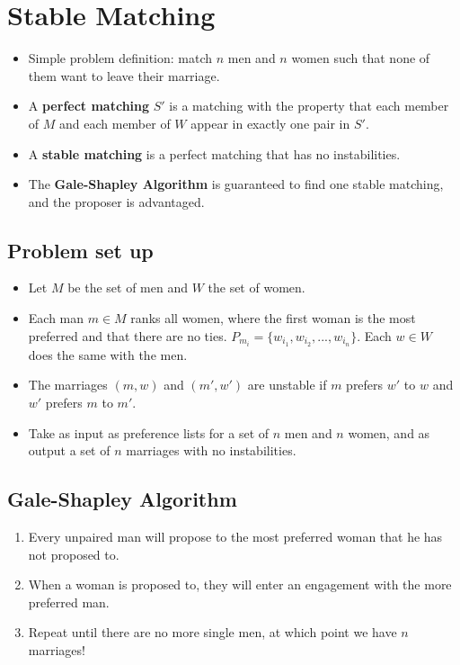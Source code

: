 \documentclass[11pt]{article}
\begin{document}
\tableofcontents
\newpage

\section{Stable Matching}
\begin{tcolorbox}
\begin{itemize}
    \item Simple problem definition: match $n$ men and $n$ women such that none of them want to leave their marriage.
    \item A \textbf{perfect matching} $S'$ is a matching with the property that each member of $M$ and each member of $W$ appear in exactly one pair in $S'$.
    \item A \textbf{stable matching} is a perfect matching that has no instabilities.
    \item The \textbf{Gale-Shapley Algorithm} is guaranteed to find one stable matching, and the proposer is advantaged.
\end{itemize}
\end{tcolorbox}

\subsection{Problem set up}
\begin{itemize}
    \item Let $M$ be the set of men and $W$ the set of women.
    \item Each man $m \in M$ ranks all women, where the first woman is the most preferred and that there are no ties. $P_{m_i} = \lbrace w_{i_1}, w_{i_2}, ..., w_{i_n} \rbrace$. Each $w \in W$ does the same with the men.
    \item The marriages $(m,w)$ and $(m', w')$ are unstable if $m$ prefers $w'$ to $w$ and $w'$ prefers $m$ to $m'$.
    \item Take as input as preference lists for a set of $n$ men and $n$ women, and as output a set of $n$ marriages with no instabilities.
    
\end{itemize}
\subsection{Gale-Shapley Algorithm}
\begin{enumerate}
    \item Every unpaired man will propose to the most preferred woman that he has not proposed to.
    \item When a woman is proposed to, they will enter an engagement with the more preferred man.
    \item Repeat until there are no more single men, at which point we have $n$ marriages!
\end{enumerate}
\end{document}
